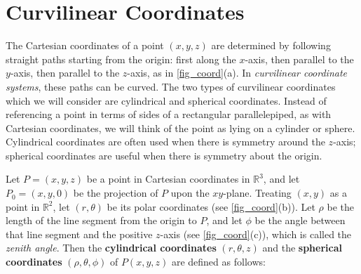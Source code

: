 \section{Curvilinear Coordinates}\label{sec:other_systems}



The Cartesian coordinates of a point $(x,y,z)$ are determined by following straight paths starting from the origin: first along the $x$-axis, then parallel to the $y$-axis, then parallel to the $z$-axis, as in \autoref{fig_coord}(a). In \emph{curvilinear coordinate systems}, these paths can be curved. The two types of curvilinear coordinates which we will consider are cylindrical and spherical coordinates. Instead of referencing a point in terms of sides of a rectangular parallelepiped, as with Cartesian coordinates, we will think of the point as lying on a cylinder or sphere. Cylindrical coordinates are often used when there is symmetry around the $z$-axis; spherical coordinates are useful when there is symmetry about the origin.

Let $P = (x,y,z)$ be a point in Cartesian coordinates in $\mathbb{R}^{3}$, and let $P_0 = (x,y,0)$ be the projection of $P$ upon the $xy$-plane. Treating $(x,y)$ as a point in $\mathbb{R}^{2}$, let $(r,\theta)$ be its polar coordinates (see \autoref{fig_coord}(b)). Let $\rho$ be the length of the line segment from the origin to $P$, and let $\phi$ be the angle between that line segment and the positive $z$-axis (see \autoref{fig_coord}(c)), which is called the \emph{zenith angle}. Then the \textbf{cylindrical coordinates} $(r,\theta,z)$  and the \textbf{spherical coordinates} $(\rho,\theta,\phi)$ of $P(x,y,z)$ are defined as follows:

